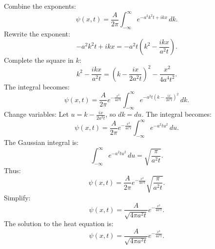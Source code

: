 \documentclass[12pt]{article}
\begin{document}
        Combine the exponents:
        \[
        \psi(x, t) = \frac{A}{2\pi} \int_{-\infty}^\infty e^{-a^2 k^2 t + ikx} \, dk.
        \]
        Rewrite the exponent:
        \[
        -a^2 k^2 t + ikx = -a^2 t \left(k^2 - \frac{ikx}{a^2 t}\right).
        \]
        Complete the square in \(k\):
        \[
        k^2 - \frac{ikx}{a^2 t} = \left(k - \frac{ix}{2a^2 t}\right)^2 - \frac{x^2}{4a^4 t^2}.
        \]
        The integral becomes:
        \[
        \psi(x, t) = \frac{A}{2\pi} e^{-\frac{x^2}{4a^2 t}} \int_{-\infty}^\infty e^{-a^2 t \left(k - \frac{ix}{2a^2 t}\right)^2} \, dk.
        \]
        Change variables: Let \(u = k - \frac{ix}{2a^2 t}\), so \(dk = du\). The integral becomes:
        \[
        \psi(x, t) = \frac{A}{2\pi} e^{-\frac{x^2}{4a^2 t}} \int_{-\infty}^\infty e^{-a^2 t u^2} \, du.
        \]
        The Gaussian integral is:
        \[
        \int_{-\infty}^\infty e^{-a^2 t u^2} \, du = \sqrt{\frac{\pi}{a^2 t}}.
        \]
        Thus:
        \[
        \psi(x, t) = \frac{A}{2\pi} e^{-\frac{x^2}{4a^2 t}} \sqrt{\frac{\pi}{a^2 t}}.
        \]
        Simplify:
        \[
        \psi(x, t) = \frac{A}{\sqrt{4\pi a^2 t}} e^{-\frac{x^2}{4a^2 t}}.
        \]
        The solution to the heat equation is:
        \[
        \boxed{\psi(x, t) = \frac{A}{\sqrt{4\pi a^2 t}} e^{-\frac{x^2}{4a^2 t}}.}
        \]
\end{document}
